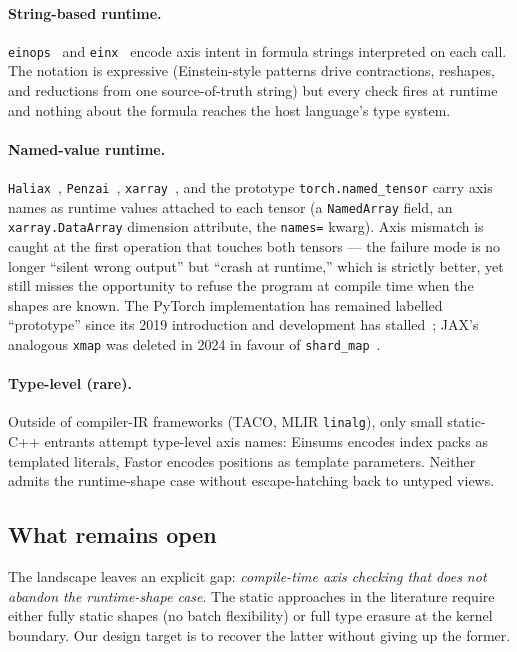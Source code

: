 \documentclass[10pt,twocolumn]{article}
\newcommand{\code}[1]{\texttt{#1}}
\begin{document}
\paragraph{String-based runtime.}
\code{einops}~\cite{rogozhnikov2022einops} and \code{einx}~\cite{flick2026einx} encode axis
intent in formula strings interpreted on each call. The notation is
expressive (Einstein-style patterns drive contractions, reshapes, and
reductions from one source-of-truth string) but every check fires at
runtime and nothing about the formula reaches the host language's
type system.

\paragraph{Named-value runtime.}
\code{Haliax}~\cite{haliax}, \code{Penzai}~\cite{penzai},
\code{xarray}~\cite{xarray}, and the prototype \code{torch.named\_tensor}
\cite{pytorch-named-tensors} carry axis names as runtime values
attached to each tensor (a \code{NamedArray} field, an
\code{xarray.DataArray} dimension attribute, the \code{names=} kwarg).
Axis mismatch is caught at the first operation that touches both
tensors --- the failure mode is no longer ``silent wrong output'' but
``crash at runtime,'' which is strictly better, yet still misses the
opportunity to refuse the program at compile time when the shapes
are known. The PyTorch implementation has remained labelled
``prototype'' since its 2019 introduction and development has
stalled~\cite{pytorch-named-tensors}; JAX's analogous \code{xmap} was
deleted in 2024 in favour of \code{shard\_map}~\cite{jax-xmap-deletion}.

\paragraph{Type-level (rare).}
Outside of compiler-IR frameworks (TACO, MLIR \code{linalg}), only
small static-C++ entrants attempt type-level axis names: Einsums
encodes index packs as templated literals, Fastor encodes positions as
template parameters. Neither admits the runtime-shape case without
escape-hatching back to untyped views.

\subsection{What remains open}
\label{sec:bg-gap}

The landscape leaves an explicit gap: \emph{compile-time axis checking
that does not abandon the runtime-shape case}. The static approaches
in the literature require either fully static shapes (no batch
flexibility) or full type erasure at the kernel boundary. Our design
target is to recover the latter without giving up the former.
\end{document}
